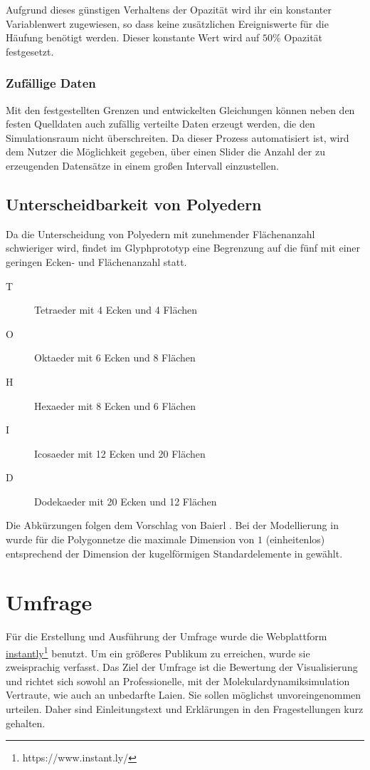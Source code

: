 Aufgrund dieses günstigen Verhaltens der Opazität wird ihr ein konstanter Variablenwert zugewiesen, so dass keine zusätzlichen Ereigniswerte für die Häufung benötigt werden. Dieser konstante Wert wird auf $50\%$ Opazität festgesetzt.

\subsubsection*{Zufällige Daten}
Mit den festgestellten Grenzen und entwickelten Gleichungen können neben den festen Quelldaten auch zufällig verteilte Daten erzeugt werden, die den Simulationsraum nicht überschreiten. Da dieser Prozess automatisiert ist, wird dem Nutzer die Möglichkeit gegeben, über einen Slider die Anzahl der zu erzeugenden Datensätze in einem großen Intervall einzustellen.

\subsection*{Unterscheidbarkeit von Polyedern}\label{sec:polyeder}
Da die Unterscheidung von Polyedern mit zunehmender Flächenanzahl schwieriger wird, findet im Glyphprototyp eine Begrenzung auf die fünf  mit einer geringen Ecken- und Flächenanzahl statt.
\begin{description}
	\item[T] Tetraeder mit 4 Ecken und 4 Flächen
	\item[O] Oktaeder mit 6 Ecken und 8 Flächen
	\item[H] Hexaeder mit 8 Ecken und 6 Flächen
	\item[I] Icosaeder mit 12 Ecken und 20 Flächen
	\item[D] Dodekaeder mit 20 Ecken und 12 Flächen
\end{description}
Die Abkürzungen folgen dem Vorschlag von Baierl \cite[S.~42]{KonvexePolyeder}. Bei der Modellierung in  wurde für die Polygonnetze die maximale Dimension von $1$ (einheitenlos) entsprechend der Dimension der kugelförmigen Standardelemente in  gewählt.

\section{Umfrage}\label{sec:umfrage}
Für die Erstellung und Ausführung der Umfrage wurde die Webplattform \href{https://www.instant.ly/}{instantly}\footnote{https://www.instant.ly/} benutzt. Um ein größeres Publikum zu erreichen, wurde sie zweisprachig verfasst. Das Ziel der Umfrage ist die Bewertung der Visualisierung und richtet sich sowohl an Professionelle, mit der Molekulardynamiksimulation Vertraute, wie auch an unbedarfte Laien. Sie sollen möglichst unvoreingenommen urteilen. Daher sind Einleitungstext und Erklärungen in den Fragestellungen kurz gehalten.


